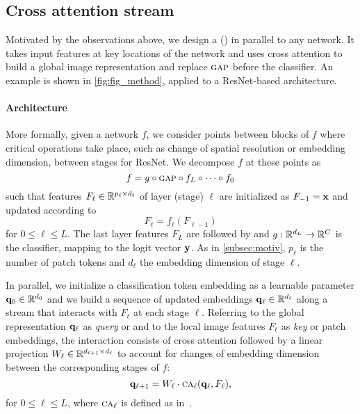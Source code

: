 
\subsection{Cross attention stream}
\label{subsec:CA-base}

Motivated by the observations above, we design a \emph{\OURS} (\emph{\Ours}) in parallel to any network. It takes input features at key locations of the network and uses cross attention to build a global image representation and replace ${\textsc{gap}}$ before the classifier. An example is shown in \autoref{fig:fig_method}, applied to a ResNet-based architecture.

\paragraph{Architecture}

More formally, given a network $f$, we consider points between blocks of $f$ where critical operations take place, such as change of spatial resolution or embedding dimension, \eg between stages for ResNet. We decompose $f$ at these points as
\begin{equation}
	f = g \circ {\textsc{gap}} \circ f_L \circ \dots \circ f_0
\label{eq:f-decomp}
\end{equation}
such that features $F_\ell \in \mathbb{R}^{p_\ell \times d_\ell}$ of layer (stage) $\ell$ are initialized as $F_{-1} = \mathbf{x}$ and updated according to
\begin{equation}
	F_\ell = f_\ell(F_{\ell-1})
\label{eq:f-layer}
\end{equation}
for $0 \le \ell \le L$. The last layer features $F_L$ are followed by \gap and $g: \mathbb{R}^{d_L} \to \mathbb{R}^C$ is the classifier, mapping to the logit vector $\mathbf{y}$. As in \autoref{subsec:motiv}, $p_\ell$ is the number of patch tokens and $d_\ell$ the embedding dimension of stage $\ell$.

In parallel, we initialize a classification token embedding as a learnable parameter $\mathbf{q}_0 \in \mathbb{R}^{d_0}$ and we build a sequence of updated embeddings $\mathbf{q}_\ell \in \mathbb{R}^{d_\ell}$ along a stream that interacts with $F_\ell$ at each stage $\ell$. Referring to the global representation $\mathbf{q}_\ell$ as \emph{query} or \cls and to the local image features $F_\ell$ as \emph{key} or patch embeddings, the interaction consists of cross attention followed by a linear projection $W_\ell \in \mathbb{R}^{d_{\ell+1} \times d_\ell}$ to account for changes of embedding dimension between the corresponding stages of $f$:
\begin{equation}
	\mathbf{q}_{\ell+1} = W_\ell \cdot {\textsc{ca}}_\ell(\mathbf{q}_\ell, F_\ell),
\label{eq:qk-layer}
\end{equation}
for $0 \le \ell \le L$, where ${\textsc{ca}}_\ell$ is defined as in~. 

